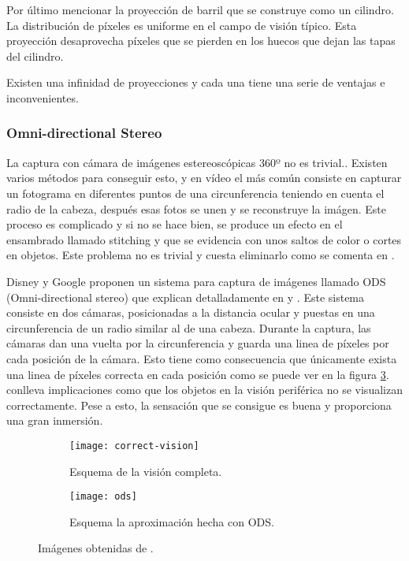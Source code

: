 Por último mencionar la proyección de barril que se construye como un cilindro. La distribución de píxeles es uniforme en el campo de visión típico. Esta proyección desaprovecha píxeles que se pierden en los huecos que dejan las tapas del cilindro.

Existen una infinidad de proyecciones y cada una tiene una serie de ventajas e inconvenientes.
 
\subsubsection{Omni-directional Stereo}
La captura con cámara de imágenes estereoscópicas 360º no es trivial.. Existen varios métodos para conseguir esto, y en vídeo el más común consiste en capturar un fotograma en diferentes puntos de una circunferencia teniendo en cuenta el radio de la cabeza, después esas fotos se unen y se reconstruye la imágen. Este proceso es complicado y si no se hace bien, se produce un efecto en el ensambrado llamado stitching y que se evidencia con unos saltos de color o cortes en objetos. Este problema no es trivial y cuesta eliminarlo como se comenta en \cite{DiegoBezStitching}.

Disney y Google proponen un sistema para captura de imágenes llamado ODS (Omni-directional stereo) que explican detalladamente en \cite{GoogleStereoscopy} y \cite{DisneyOmnistereoscopic}. Este sistema consiste en dos cámaras, posicionadas a la distancia ocular y puestas en una circunferencia de un radio similar al de una cabeza. Durante la captura, las cámaras dan una vuelta por la circunferencia y guarda una linea de píxeles por cada posición de la cámara. Esto tiene como consecuencia que únicamente exista una linea de píxeles correcta en cada posición como se puede ver en la figura \ref{fig:ods-schema}.  conlleva implicaciones como que los objetos en la visión periférica no se visualizan correctamente. Pese a esto, la sensación que se consigue es buena y proporciona una gran inmersión.

\begin{figure}[H]
\centering
\begin{subfigure}{.47\linewidth}
	\centering
  \texttt{[image: correct-vision]}
  \caption{Esquema de la visión completa.}
  \label{fig:correct-vision-schema}
\end{subfigure}%
\hspace{.05\linewidth}
\begin{subfigure}{.47\linewidth}
	\centering
  \texttt{[image: ods]}
  \caption{Esquema la aproximación hecha con ODS.}
  \label{fig:ods-schema}
\end{subfigure}
\caption{Imágenes obtenidas de \cite{GoogleStereoscopy}.}
\end{figure}
\FloatBarrier

